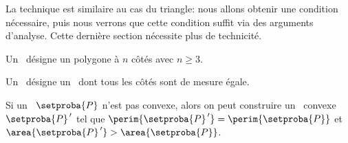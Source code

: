 La technique est similaire au cas du triangle: nous allons obtenir une condition nécessaire, puis nous verrons que cette condition suffit via des arguments d'analyse. Cette dernière section nécessite plus de technicité.




\begin{defi}
	Un \og \emph{\ngone} \fg\ désigne un polygone à $n$ côtés avec $n \geq 3$.
\end{defi}


\begin{defi}
	Un \og \emph{\niso} \fg\ désigne un \ngone\ dont tous les côtés sont de mesure égale.
\end{defi}




\begin{fact} \label{conv-poly}
	Si un \ngone\ $\setproba{P}$ n'est pas convexe, alors on peut construire un \ngone\ convexe $\setproba{P}^{\,\prime}$ tel que 
	$\perim{\setproba{P}^{\,\prime}} = \perim{\setproba{P}}$ 
	et 
	$\area{\setproba{P}^{\,\prime}} > \area{\setproba{P}}$.
\end{fact}



